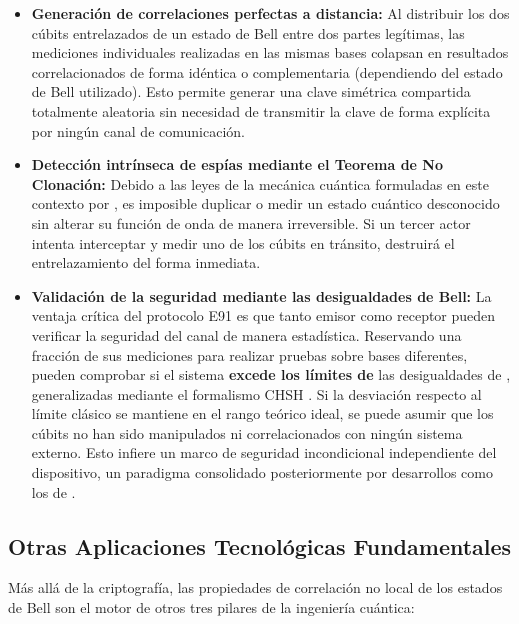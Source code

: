 \documentclass[11pt,a4paper,spanish]{book}
\begin{document}
\begin{itemize}
    \item \textbf{Generación de correlaciones perfectas a distancia:} Al distribuir los dos cúbits entrelazados de un estado de Bell entre dos partes legítimas, las mediciones individuales realizadas en las mismas bases colapsan en resultados correlacionados de forma idéntica o complementaria (dependiendo del estado de Bell utilizado). Esto permite generar una clave simétrica compartida totalmente aleatoria sin necesidad de transmitir la clave de forma explícita por ningún canal de comunicación.
    
    \item \textbf{Detección intrínseca de espías mediante el Teorema de No Clonación:} Debido a las leyes de la mecánica cuántica formuladas en este contexto por \cite{wootters1982}, es imposible duplicar o medir un estado cuántico desconocido sin alterar su función de onda de manera irreversible. Si un tercer actor  intenta interceptar y medir uno de los cúbits en tránsito, destruirá el entrelazamiento del forma inmediata.
    
\item \textbf{Validación de la seguridad mediante las desigualdades de Bell:} La ventaja crítica del protocolo E91 es que tanto emisor como receptor pueden verificar la seguridad del canal de manera estadística. Reservando una fracción de sus mediciones para realizar pruebas sobre bases diferentes, pueden comprobar si el sistema \textbf{excede los límites de} las desigualdades de \cite{bell1964}, generalizadas mediante el formalismo CHSH \citep{clauser1969}. Si la desviación respecto al límite clásico se mantiene en el rango teórico ideal, se puede asumir que los cúbits no han sido manipulados ni correlacionados con ningún sistema externo. Esto infiere un marco de seguridad incondicional independiente del dispositivo, un paradigma consolidado posteriormente por desarrollos como los de \cite{masanes2010}.\end{itemize}

\subsection{Otras Aplicaciones Tecnológicas Fundamentales}
Más allá de la criptografía, las propiedades de correlación no local de los estados de Bell son el motor de otros tres pilares de la ingeniería cuántica:
\end{document}
